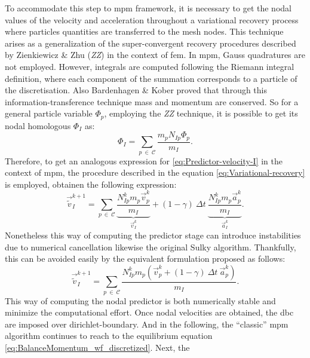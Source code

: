 \documentclass[preprint,12pt,a4paper]{elsarticle}
\begin{document}
To accommodate this step to \acrshort{mpm} framework, it is necessary to get
the nodal values of the velocity and acceleration throughout a variational
recovery process where particles quantities are transferred to the
mesh nodes. This technique arises as a generalization of the super-convergent recovery
procedures described by Zienkiewicz \& Zhu \cite{ZZ1992_I} (\textit{ZZ})
in the context of \acrshort{fem}. In \acrshort{mpm}, Gauss quadratures are not employed. However, 
integrals are computed following the Riemann integral definition,
where each component of the summation corresponds to a particle of the
discretisation. Also Bardenhagen \& Kober \cite{Bardenhagen2004}
proved that through this information-transference technique mass and momentum are conserved. So for a general particle variable $\Phi_p$, employing the
\textit{ZZ} technique, it is possible to get its nodal homologous $\Phi_I$  as:
\begin{equation}
  \label{eq:Variational-recovery}
   \Phi_I = \sum_{p\ \in\ \mathcal{C}} \frac{m_p N_{Ip} \Phi_p}{m_I}.
 \end{equation}
 Therefore, to get an analogous expression for
 \eqref{eq:Predictor-velocity-I} in the context of \acrshort{mpm}, the
 procedure described in the equation \eqref{eq:Variational-recovery}
 is employed, obtainen the following expression:
 \begin{equation}
   \label{eq:Predictor-velocity-II}
   \vec{\tilde{v}}_I^{k+1} = \sum_{p\ \in\ \mathcal{C}} \underbrace{\frac{N_{Ip}^{k} m_p
       \vec{v}_p^k}{m_I}}_{\vec{v}_I^{k}} + (1 - \gamma)\ \Delta t\  \underbrace{\frac{N_{Ip}^{k} m_p \vec{a}_p^k}{m_I}}_{\vec{a}_I^{k}}.
 \end{equation}
Nonetheless this way of computing the predictor stage can introduce
instabilities due to numerical cancellation likewise the original
Sulky algorithm. Thankfully, this can be avoided easily by the
equivalent formulation proposed as follows: 
\begin{equation}
  \label{eq:Predictor-velocity-II}
  \vec{\tilde{v}}_I^{k+1} =  \sum_{p\ \in\ \mathcal{C}} \frac{ N_{Ip}^{k} m_p (\vec{v}_p^k + (1 - \gamma)\ \Delta t\ \vec{a}_p^k)}{m_I}.
\end{equation}
This way of computing the nodal predictor is both numerically stable
and minimize the computational effort. Once nodal velocities are
obtained, the \acrshort{dbc} are imposed over \gls{dirichlet-boundary}. And in the
following, the ``classic'' \acrshort{mpm} algorithm continues to reach to the
equilibrium equation \eqref{eq:BalanceMomentum_wf_discretized}. Next, the
\end{document}
